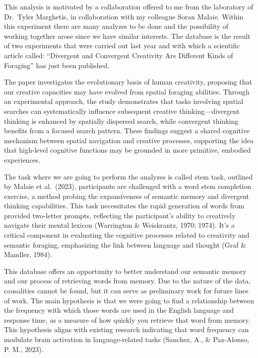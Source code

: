 \documentclass[
]{article}
\begin{document}
This analysis is motivated by a collaboration offered to me from the
laboratory of Dr.~Tyler Marghetis, in collaboration with my colleague
Soran Malaie. Within this experiment there are many analyzes to be done
and the possibility of working together arose since we have similar
interests. The database is the result of two experiments that were
carried out last year and with which a scientific article called:
``Divergent and Convergent Creativity Are Different Kinds of Foraging''
has just been published.

The paper investigates the evolutionary basis of human creativity,
proposing that our creative capacities may have evolved from spatial
foraging abilities. Through an experimental approach, the study
demonstrates that tasks involving spatial searches can systematically
influence subsequent creative thinking---divergent thinking is enhanced
by spatially dispersed search, while convergent thinking benefits from a
focused search pattern. These findings suggest a shared cognitive
mechanism between spatial navigation and creative processes, supporting
the idea that high-level cognitive functions may be grounded in more
primitive, embodied experiences.

The task where we are going to perform the analyzes is called stem task,
outlined by Malaie et al.~(2023), participants are challenged with a
word stem completion exercise, a method probing the expansiveness of
semantic memory and divergent thinking capabilities. This task
necessitates the rapid generation of words from provided two-letter
prompts, reflecting the participant's ability to creatively navigate
their mental lexicon (Warrington \& Weiskrantz, 1970; 1974). It's a
critical component in evaluating the cognitive processes related to
creativity and semantic foraging, emphasizing the link between language
and thought (Graf \& Mandler, 1984).

This database offers an opportunity to better understand our semantic
memory and our process of retrieving words from memory. Due to the
nature of the data, causalities cannot be found, but it can serve as
preliminary work for future lines of work. The main hypothesis is that
we were going to find a relationship between the frequency with which
those words are used in the English language and response time, as a
measure of how quickly you retrieve that word from memory. This
hypothesis aligns with existing research indicating that word frequency
can modulate brain activation in language-related tasks (Sanchez, A., \&
Paz-Alonso, P. M., 2023).
\end{document}
